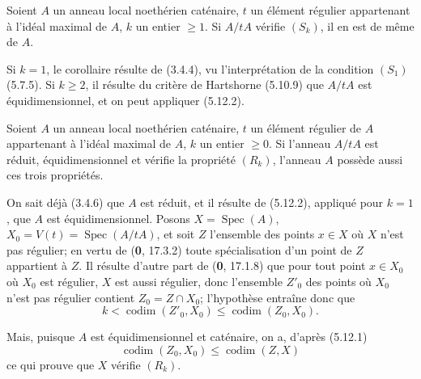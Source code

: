 \begin{corollary}[5.12.4]
\label{IV.2.s5.12.4-fr}
Soient $A$ un anneau local noethérien caténaire, $t$ un élément régulier
appartenant à l'idéal maximal de $A$, $k$ un entier $\geq1$. Si $A/tA$
vérifie $(S_k)$, il en est de même de $A$.
\end{corollary}

Si $k=1$, le corollaire résulte de (3.4.4), vu l'interprétation de la condition
$(S_1)$ (5.7.5). Si $k\geq2$, il résulte du critère de Hartshorne (5.10.9) que
$A/tA$ est équidimensionnel, et on peut appliquer (5.12.2).

\begin{proposition}[5.12.5]
\label{IV.2.s5.12.5-fr}
Soient $A$ un anneau local noethérien caténaire, $t$ un élément régulier de $A$
appartenant à l'idéal maximal de $A$, $k$ un entier $\geq0$. Si l'anneau
$A/tA$ est réduit, équidimensionnel et vérifie la propriété $(R_k)$, l'anneau
$A$ possède aussi ces trois propriétés.
\end{proposition}

On sait déjà (3.4.6) que $A$ est réduit, et il résulte de (5.12.2), appliqué
pour $k=1$, que $A$ est équidimensionnel. Posons
$X=\operatorname{Spec}(A)$, $X_0=V(t)=\operatorname{Spec}(A/tA)$, et soit $Z$
l'ensemble des points $x\in X$ où $X$ n'est pas régulier; en vertu de (\textbf{0},
17.3.2) toute spécialisation d'un point de $Z$ appartient à $Z$. Il résulte
d'autre part de (\textbf{0}, 17.1.8) que pour tout point $x\in X_0$ où $X_0$ est
régulier, $X$ est aussi régulier, donc l'ensemble $Z'_0$ des points où $X_0$
n'est pas régulier contient $Z_0=Z\cap X_0$; l'hypothèse entraîne donc que
\[
k<\operatorname{codim}(Z'_0,X_0)\leq\operatorname{codim}(Z_0,X_0).
\]

Mais, puisque $A$ est équidimensionnel et caténaire, on a, d'après (5.12.1)
\[
\operatorname{codim}(Z_0,X_0)\leq\operatorname{codim}(Z,X)
\]
ce qui prouve que $X$ vérifie $(R_k)$.

